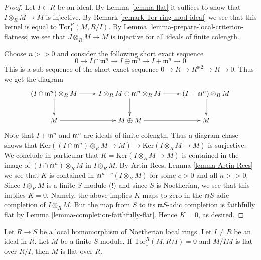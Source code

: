 \begin{proof}
Let $I \subset R$ be an ideal. By Lemma \ref{lemma-flat} it suffices
to show that $I \otimes_R M \to M$ is injective. By Remark
\ref{remark-Tor-ring-mod-ideal} we see that this kernel is
equal to $\text{Tor}_1^R(M, R/I)$. By
Lemma \ref{lemma-prepare-local-criterion-flatness}
we see that $J \otimes_R M \to M$ is injective for all ideals
of finite colength.

\medskip\noindent
Choose $n >> 0$ and consider the following short exact
sequence
$$
0
\to I \cap \mathfrak m^n
\to I \oplus \mathfrak m^n
\to I + \mathfrak m^n
\to 0
$$
This is a sub sequence of the short exact sequence
$0 \to R \to R^{\oplus 2} \to R \to 0$. Thus we get the diagram
$$
\xymatrix{
(I\cap \mathfrak m^n) \otimes_R M \ar[r] \ar[d] &
I \otimes_R M \oplus \mathfrak m^n \otimes_R M \ar[r] \ar[d] &
(I + \mathfrak m^n) \otimes_R M \ar[d] \cr
M \ar[r] &
M \oplus M \ar[r] &
M
}
$$
Note that $I + \mathfrak m^n$ and $\mathfrak m^n$
are ideals of finite colength.
Thus a diagram chase shows that
$\text{Ker}((I \cap \mathfrak m^n)\otimes_R M \to M)
\to \text{Ker}(I\otimes_R M \to M)$
is surjective. We conclude in particular that
$K = \text{Ker}(I\otimes_R M \to M)$ is contained
in the image of $(I \cap \mathfrak m^n) \otimes_R M$
in $I \otimes_R M$. By Artin-Rees, Lemma \ref{lemma-Artin-Rees}
we see that $K$ is contained
in $\mathfrak m^{n-c}(I \otimes_R M)$ for some $c > 0$
and all $n >> 0$. Since $I \otimes_R M$ is a finite
$S$-module (!) and since $S$ is Noetherian, we see
that this implies $K = 0$. Namely, the above implies
$K$ maps to zero in the $\mathfrak mS$-adic completion
of $I\otimes_R M$. But the map from $S$
to its $\mathfrak mS$-adic completion is faithfully flat
by Lemma \ref{lemma-completion-faithfully-flat}.
Hence $K = 0$, as desired.
\end{proof}

\begin{lemma}
\label{lemma-variant-local-criterion-flatness}
Let $R \to S$ be a local homomorphism of Noetherian
local rings. Let $I \not = R$ be an ideal in $R$.
Let $M$ be a finite $S$-module. If $\text{Tor}_1^R(M, R/I) = 0$
and $M/IM$ is flat over $R/I$, then $M$ is flat over $R$.
\end{lemma}

